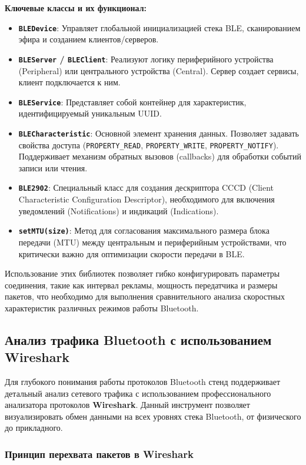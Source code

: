 \textbf{Ключевые классы и их функционал:}
\begin{itemize}[nosep]
    \item \textbf{\texttt{BLEDevice}}: Управляет глобальной инициализацией стека BLE, сканированием эфира и созданием клиентов/серверов.
    \item \textbf{\texttt{BLEServer} / \texttt{BLEClient}}: Реализуют логику периферийного устройства (Peripheral) или центрального устройства (Central). Сервер создает сервисы, клиент подключается к ним.
    \item \textbf{\texttt{BLEService}}: Представляет собой контейнер для характеристик, идентифицируемый уникальным UUID.
    \item \textbf{\texttt{BLECharacteristic}}: Основной элемент хранения данных. Позволяет задавать свойства доступа (\texttt{PROPERTY\_READ}, \texttt{PROPERTY\_WRITE}, \texttt{PROPERTY\_NOTIFY}). Поддерживает механизм обратных вызовов (callbacks) для обработки событий записи или чтения.
    \item \textbf{\texttt{BLE2902}}: Специальный класс для создания дескриптора CCCD (Client Characteristic Configuration Descriptor), необходимого для включения уведомлений (Notifications) и индикаций (Indications).
    \item \textbf{\texttt{setMTU(size)}}: Метод для согласования максимального размера блока передачи (MTU) между центральным и периферийным устройствами, что критически важно для оптимизации скорости передачи в BLE.
\end{itemize}

Использование этих библиотек позволяет гибко конфигурировать параметры соединения, такие как интервал рекламы, мощность передатчика и размеры пакетов, что необходимо для выполнения сравнительного анализа скоростных характеристик различных режимов работы Bluetooth.

\subsection{Анализ трафика Bluetooth с использованием Wireshark}

Для глубокого понимания работы протоколов Bluetooth стенд поддерживает детальный анализ сетевого трафика с использованием профессионального анализатора протоколов \textbf{Wireshark}. Данный инструмент позволяет визуализировать обмен данными на всех уровнях стека Bluetooth, от физического до прикладного.

\subsubsection{Принцип перехвата пакетов в Wireshark}

